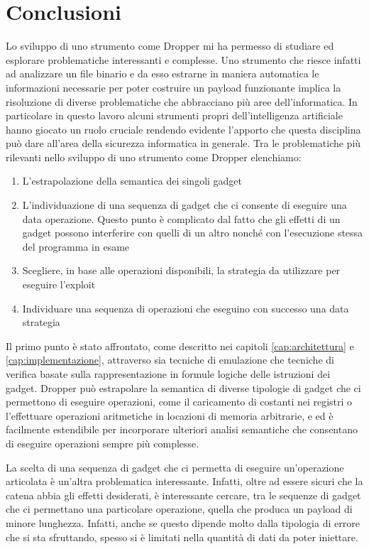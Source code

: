 \chapter{Conclusioni}

Lo sviluppo di uno strumento come Dropper mi ha permesso di studiare
ed esplorare problematiche interessanti e complesse. Uno strumento che
riesce infatti ad analizzare un file binario e da esso estrarne in
maniera automatica le informazioni necessarie per poter costruire un
payload funzionante implica la risoluzione di diverse problematiche
che abbracciano più aree dell'informatica. In particolare in questo
lavoro alcuni strumenti propri dell'intelligenza artificiale hanno
giocato un ruolo cruciale rendendo evidente l'apporto che questa
disciplina può dare all'area della sicurezza informatica in
generale. Tra le problematiche più rilevanti nello sviluppo di uno
strumento come Dropper elenchiamo:

\begin{enumerate}
\item L'estrapolazione della semantica dei singoli gadget
\item L'individuazione di una sequenza di gadget che ci consente di
  eseguire una data operazione. Questo punto è complicato dal fatto che gli
  effetti di un gadget possono interferire con quelli di un altro
  nonché con l'esecuzione stessa del programma in esame
\item Scegliere, in base alle operazioni disponibili, la strategia da
  utilizzare per eseguire l'exploit
\item Individuare una sequenza di operazioni che eseguino con successo
  una data strategia
\end{enumerate}

Il primo punto è stato affrontato, come descritto nei capitoli
\ref{cap:architettura} e \ref{cap:implementazione}, attraverso sia
tecniche di emulazione che tecniche di verifica basate sulla
rappresentazione in formule logiche delle istruzioni dei
gadget. Dropper può estrapolare la semantica di diverse tipologie di
gadget che ci permettono di eseguire operazioni, come il caricamento di
costanti nei registri o l'effettuare operazioni aritmetiche in
locazioni di memoria arbitrarie, e ed è facilmente estendibile per
incorporare ulteriori analisi semantiche che consentano di eseguire
operazioni sempre più complesse.

La scelta di una sequenza di gadget che ci permetta di eseguire
un'operazione articolata è un'altra problematica
interessante. Infatti, oltre ad essere sicuri che la catena abbia gli
effetti desiderati, è interessante cercare, tra le sequenze di gadget
che ci permettano una particolare operazione, quella che produca un
payload di minore lunghezza. Infatti, anche se questo dipende molto
dalla tipologia di errore che si sta sfruttando, spesso si è limitati
nella quantità di dati da poter iniettare.

